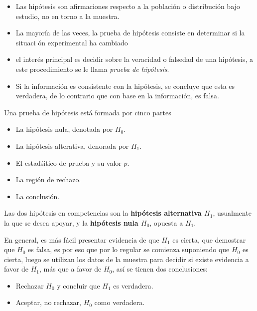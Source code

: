 \begin{frame}
\begin{frame}
\begin{itemize}
\item Las hip\'otesis son afirmaciones respecto a la poblaci\'on o distribuci\'on bajo estudio, no en torno a la muestra.

\item La mayor\'ia de las veces, la prueba de hip\'otesis consiste en determinar si la situaci \'on experimental ha cambiado

\item el inter\'es principal es decidir sobre la veracidad o falsedad de una hip\'otesis, a este procedimiento se le llama \textit{prueba de hip\'otesis}.

\item Si la informaci\'on es consistente con la hip\'otesis, se concluye que esta es verdadera, de lo contrario que con base en la informaci\'on, es falsa.

\end{itemize}







Una prueba de hip\'otesis est\'a formada por cinco partes
\begin{itemize}
\item La hip\'otesis nula, denotada por $H_{0}$.
\item La hip\'otesis alterativa, denorada por $H_{1}$.
\item El estad\'sitico de prueba y su valor $p$.
\item La regi\'on de rechazo.
\item La conclusi\'on.

\end{itemize}


\begin{Def}
Las dos hip\'otesis en competencias son la \textbf{hip\'otesis alternativa $H_{1}$}, usualmente la que se desea apoyar, y la \textbf{hip\'otesis nula $H_{0}$}, opuesta a $H_{1}$.
\end{Def}







En general, es m\'as f\'acil presentar evidencia de que $H_{1}$ es cierta, que demostrar 	que $H_{0}$ es falsa, es por eso que por lo regular se comienza suponiendo que $H_{0}$ es cierta, luego se utilizan los datos de la muestra para decidir si existe evidencia a favor de $H_{1}$, m\'as que a favor de $H_{0}$, as\'i se tienen dos conclusiones:
\begin{itemize}
\item Rechazar $H_{0}$ y concluir que $H_{1}$ es verdadera.
\item Aceptar, no rechazar, $H_{0}$ como verdadera.


\end{itemize}
\end{frame}
\end{frame}
